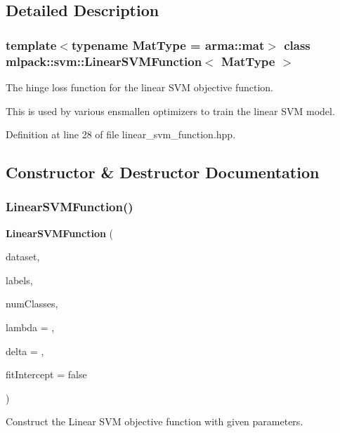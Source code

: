 \subsection{Detailed Description}
\subsubsection*{template$<$typename Mat\+Type = arma\+::mat$>$\newline
class mlpack\+::svm\+::\+Linear\+S\+V\+M\+Function$<$ Mat\+Type $>$}

The hinge loss function for the linear S\+VM objective function. 

This is used by various ensmallen optimizers to train the linear S\+VM model. 

Definition at line 28 of file linear\+\_\+svm\+\_\+function.\+hpp.



\subsection{Constructor \& Destructor Documentation}
\mbox{\label{classmlpack_1_1svm_1_1LinearSVMFunction_af445da901fbdbaf4a6624eb7c59a219f}} 
\subsubsection{Linear\+S\+V\+M\+Function()}
{\footnotesize\ttfamily \textbf{ Linear\+S\+V\+M\+Function} (\begin{DoxyParamCaption}\item[{const Mat\+Type \&}]{dataset,  }\item[{const arma\+::\+Row$<$ size\+\_\+t $>$ \&}]{labels,  }\item[{const size\+\_\+t}]{num\+Classes,  }\item[{const double}]{lambda = {},  }\item[{const double}]{delta = {},  }\item[{const bool}]{fit\+Intercept = {\ttfamily false} }\end{DoxyParamCaption})}



Construct the Linear S\+VM objective function with given parameters. 


